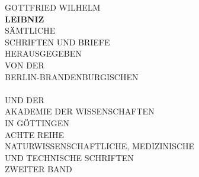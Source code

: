 \documentclass[fontsize=10pt,twoside,DIV=calc,BCOR0mm,headings=small,numbers=enddot,headinclude=false,footinclude=true,
openany]{scrbook}
\begin{document}
        \begin{titlepage}
        \begin{center}
        {\huge GOTTFRIED WILHELM}\\
        \vspace{5.5mm}
        {\Huge \textbf{LEIBNIZ}}\\
        \vspace{10mm}
        {\Large SÄMTLICHE}\\
        \vspace{2mm}
         {\Large SCHRIFTEN UND BRIEFE}\\
        \vspace{22mm}
        {\large HERAUSGEGEBEN}\\
        \vspace{1mm}
        {\large VON DER}\\
        \vspace{6.5mm}
        {\Large BERLIN-BRANDENBURGISCHEN}\\
        \vspace{2mm}{\Large AKADEMIE DER WISSENSCHAFTEN}\\
        \vspace{2mm}
        {\Large UND DER}\\
        \vspace{2mm}
        {\Large AKADEMIE DER WISSENSCHAFTEN}\\
        \vspace{2mm}
        {\Large IN GÖTTINGEN}\\
        \vspace{22mm}
        {\Large ACHTE REIHE}\\
        \vspace{5.5mm}
        {\large NATURWISSENSCHAFTLICHE, MEDIZINISCHE}\\ 
        \vspace{1mm}
        {\large UND TECHNISCHE SCHRIFTEN}\\
        \vspace{5.5mm}
        {\Large ZWEITER BAND}
        \end{center}
        \end{titlepage}
        
\end{document}
